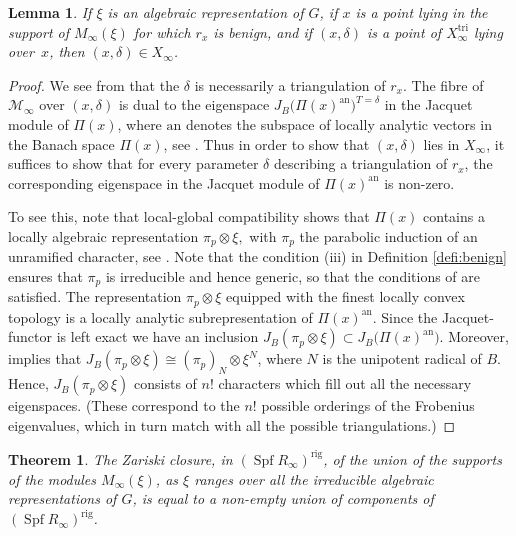 \documentclass[JEP,XML,SOM,Unicode,NoEqCountersInSection]{cedram}
\let\mathcal\mathscr
\newtheorem{lem}[prop]{Lemma}
\newtheorem{thm}[prop]{Theorem}
\theoremstyle{definition}
\DeclareMathOperator{\Spf}{Spf}
\newcommand{\cM}{\mathcal{M}}
\newcommand{\ana}{\mathrm{an}}
\newcommand\rig{\mathrm{rig}}
\newcommand\tri{\mathrm{tri}}
\begin{document}
\begin{lem}
\label{lem:refinements}
If $\xi$ is an algebraic representation of $G$,
if $x$ is a point lying in the support of $M_{\infty}(\xi)$ for which
$r_x$ is benign, and if $(x,\delta)$ is a point of $X_{\infty}^{\tri}$
lying over~$x$, then $(x,\delta) \in X_{\infty}$.
\end{lem}

\begin{proof}
We see from \cite[Cor.\,2.12]{BHS} that the $\delta$ is necessarily
a triangulation of $r_x$.
The fibre of $\cM_{\infty}$ over $(x,\delta)$ is dual to the eigenspace
$J_B\bigl(\Pi(x)^{\ana}\bigr)^{T = \delta}$ in the Jacquet module of $\Pi(x)$, where $\ana$ denotes the subspace
of locally analytic vectors in the Banach space $\Pi(x)$, see \cite[Prop.\,3.7]{BHS}.
Thus in order to show that $(x,\delta)$ lies in $X_{\infty}$,
it suffices to show that for every parameter $\delta$ describing
a triangulation of $r_x$, the corresponding eigenspace in the Jacquet
module of $\Pi(x)^{\ana}$ is non-zero.\enlargethispage{\baselineskip}%

To see this, note that local-global compatibility shows that $\Pi(x)$
contains a locally algebraic representation $\pi_p \otimes \xi,$
with $\pi_p$ the parabolic induction of an unramified character, see \cite[Th.\,4.35]{six-authors}. Note that the condition (iii) in Definition
\ref{defi:benign} ensures that $\pi_p$ is irreducible and hence generic, so that the conditions of \cite[Th.\,4.35]{six-authors} are satisfied.
The representation $\pi_p \otimes \xi$ equipped with the finest locally convex topology is a locally analytic subrepresentation
of $\Pi(x)^{\ana}$. Since the Jacquet-functor is left exact we have an inclusion $J_B(\pi_p \otimes \xi)\subset J_B\bigl(\Pi(x)^{\ana}\bigr)$.
Moreover, \cite[Prop.\,4.3.6]{Jacquet-one} implies that $J_B(\pi_p \otimes \xi)\cong (\pi_p)_N \otimes \xi^N$, where $N$ is the unipotent radical
of $B$. Hence, $J_B(\pi_p\otimes\xi)$ consists of $n!$ characters which fill out
all the necessary eigenspaces. (These correspond to the $n!$ possible
orderings of the Frobenius eigenvalues, which in turn
match with all the possible triangulations.)
\end{proof}

\begin{thm}
The Zariski closure, in $(\Spf R_{\infty})^{\rig}$, of the
union of the supports of the modules $M_{\infty}(\xi)$,
as $\xi$ ranges over all the irreducible algebraic representations
of $G$, is equal to a non-empty union of components
of $(\Spf R_{\infty})^{\rig}$.
\end{thm}
\end{document}
